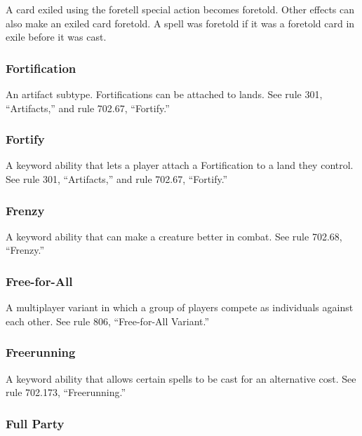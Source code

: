 {{{{{{{{{{{{{A card exiled using the foretell special action becomes foretold. Other effects can also make an exiled card foretold. A spell was foretold if it was a foretold card in exile before it was cast.

\subsubsection*{Fortification}

An artifact subtype. Fortifications can be attached to lands. See rule 301, “Artifacts,” and rule 702.67, “Fortify.”

\subsubsection*{Fortify}

A keyword ability that lets a player attach a Fortification to a land they control. See rule 301, “Artifacts,” and rule 702.67, “Fortify.”

\subsubsection*{Frenzy}

A keyword ability that can make a creature better in combat. See rule 702.68, “Frenzy.”

\subsubsection*{Free-for-All}

A multiplayer variant in which a group of players compete as individuals against each other. See rule 806, “Free-for-All Variant.”

\subsubsection*{Freerunning}

A keyword ability that allows certain spells to be cast for an alternative cost. See rule 702.173, “Freerunning.”

\subsubsection*{Full Party}

}}}}}}}}}}}}}
